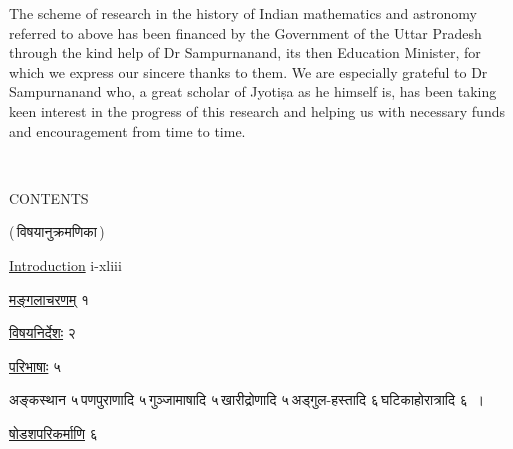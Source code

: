 \documentclass[10pt, openany]{book}
\begin{document}
\vspace{0.3cm} {The scheme of research in the history of Indian mathematics and}
{astronomy referred to above has been financed by the Government of the}
{Uttar Pradesh through the kind help of Dr Sampurnanand, its then}
{Education Minister, for which we express our sincere thanks to them.
We}
{are especially grateful to Dr Sampurnanand who, a great scholar of}
{Jyotiṣa as he himself is, has been taking keen interest in the progress
of}
{this research and helping us with necessary funds and encouragement
from
time to time.}

~~~~~


\newpage

\thispagestyle{empty}

\sanskritfont\justify\begin{center}{{\large CONTENTS}}
\vspace{3mm}

(\,विषयानुक्रमणिका\,)\end{center}
\vspace{1mm}

\noindent \hyperref[Int]{Introduction} \hfill i-xliii

\vspace{2mm}

\noindent \hyperref[Mang]{मङ्गलाचरणम्} \hfill १~

\vspace{2mm}

\noindent \hyperref[Vish]{विषयनिर्देशः}   \hfill २~

\vspace{2mm}

\noindent \hyperref[Pari]{परिभाषाः} \hfill ५
\vspace{2mm}

\begin{minipage}{0.8\textwidth}

अङ्कस्थान ५\textemdash \,पणपुराणादि ५\textemdash \,गुञ्जामाषादि ५\textemdash \,खारीद्रोणादि ५\textemdash \,अड्गुल-हस्तादि ६\textemdash \,घटिकाहोरात्रादि ६~।
\end{minipage}

\vspace{2mm}


\vspace{2mm}

\noindent \hyperref[14.1]{षोडशपरिकर्माणि}  \hfill ६
\vspace{2mm}
\end{document}
